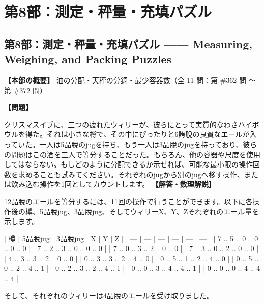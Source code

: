 \documentclass[10pt,a4paper,oneside,openany]{ltjsbook}
\begin{document}
\part{第8部：測定・秤量・充填パズル}
\chapter*{第8部：測定・秤量・充填パズル —— Measuring, Weighing, and Packing Puzzles}

\textbf{【本部の概要】} 油の分配・天秤の分銅・最少容器数（全 11 問：第 \#362 問 〜 第 \#372 問）

\vspace{1em}

\begin{tcolorbox}[colback=softblue,colframe=primaryblue,title=\textbf{第 362 問：わさハイボウル （原題: THE WASSAIL BOWL.）},arc=2mm,boxrule=1pt,breakable]
\textbf{【問題】}\par\vspace{0.3em}
クリスマスイブに、三つの疲れたウィリーが、彼らにとって実質的なわさハイボウルを得た。それは小さな樽で、その中にぴったりと6誇脫の良質なエールが入っていた。一人は5品脫のjugを持ち、もう一人は3品脫のjugを持っており、彼らの問題はこの酒を三人で等分することだった。もちろん、他の容器や尺度を使用してはならない。もしどのように分配できるか示せれば、可能な最小限の操作回数を求めることも試みてください。それぞれのjugから別のjugへ移す操作、または飲み込む操作を1回としてカウントします。
\tcblower
\textbf{【解答・数理解説】}\par\vspace{0.3em}
12品脫のエールを等分するには、11回の操作で行うことができます。以下に各操作後の樽、5品脫jug、3品脫jug、そしてウィリーX、Y、Zそれぞれのエール量を示します。

| 樽 | 5品脫jug | 3品脫jug | X | Y | Z |
| --- | --- | --- | --- | --- | --- |
| 7 .. 5 .. 0 .. 0 .. 0 .. 0 |
| 7 .. 2 .. 3 .. 0 .. 0 .. 0 |
| 7 .. 0 .. 3 .. 2 .. 0 .. 0 |
| 7 .. 3 .. 0 .. 2 .. 0 .. 0 |
| 4 .. 3 .. 3 .. 2 .. 0 .. 0 |
| 0 .. 3 .. 3 .. 2 .. 4 .. 0 |
| 0 .. 5 .. 1 .. 2 .. 4 .. 0 |
| 0 .. 5 .. 0 .. 2 .. 4 .. 1 |
| 0 .. 2 .. 3 .. 2 .. 4 .. 1 |
| 0 .. 0 .. 3 .. 4 .. 4 .. 1 |
| 0 .. 0 .. 0 .. 4 .. 4 .. 4 |

そして、それぞれのウィリーは4品脫のエールを受け取りました。
\end{tcolorbox}
\end{document}
